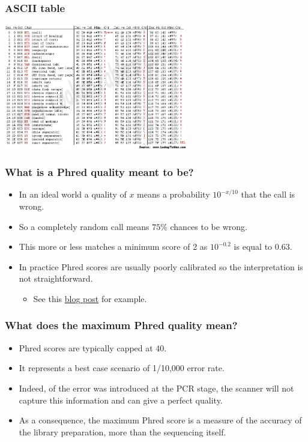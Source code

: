 \documentclass{beamer}
\begin{document}
\begin{frame}
  \frametitle{ASCII table}
  \begin{center}
    \includegraphics[width=8cm]{fig/asciifull.jpg}
  \end{center}
\end{frame}



\begin{frame}
  \frametitle{What is a Phred quality meant to be?}
  \begin{itemize}
  \item In an ideal world a quality of $x$ means a probability $10^{- x \slash 10}$ that the call is wrong.
  \item So a completely random call means $75\%$ chances to be wrong.
  \item This more or less matches a minimum score of 2 as $10^{-0.2}$ is equal to 0.63. 
  \item In practice Phred scores are usually poorly calibrated so the interpretation is not straightforward.
    \begin{itemize}
    \item See this \href{http://pathogenomics.bham.ac.uk/blog/2011/07/ion-torrent-316-first-impressions/}{blog post} for example.
    \end{itemize}
  \end{itemize}
\end{frame}

\begin{frame}
  \frametitle{What does the maximum Phred quality mean?}
   \begin{itemize}
   \item Phred scores are typically capped at 40.
   \item It represents a best case scenario of 1/10,000 error rate.
   \item Indeed, of the error was introduced at the PCR stage, the scanner will not capture this information and can give a perfect quality.
   \item As a consequence, the maximum Phred score is a measure of the accuracy of the library preparation, more than the sequencing itself.
   \end{itemize}
\end{frame}
\end{document}
